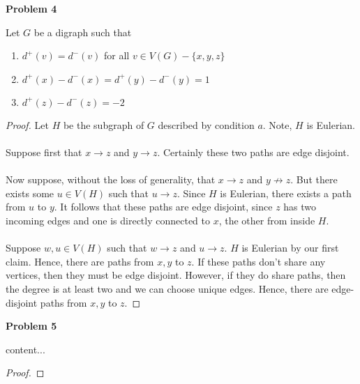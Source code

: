 \documentclass{article}
\newenvironment{claim}[2][Claim]{\begin{trivlist}
		\item[\hskip \labelsep {\bfseries #1}\hskip \labelsep {\bfseries #2}]}{\end{trivlist}}
\begin{document}
\noindent \textbf{Problem 4}
\begin{claim}{}
	Let $G$ be a digraph such that 
	\begin{enumerate}[label=\alph*)]
		\item $d^+(v) = d^-(v)$ for all $v \in V(G) - \{ x,y,z\}$ 
		\item $d^+(x) - d^-(x) = d^+(y) - d^-(y) = 1$
		\item $d^+(z) - d^-(z) = -2$
	\end{enumerate}

\end{claim}
\begin{proof}
	Let $H$ be the subgraph of $G$ described by condition $a$. Note, $H$ is Eulerian. \\ \\
	Suppose first that $x \rightarrow z$ and $y \rightarrow z$. Certainly these two paths are edge disjoint. \\ \\
	Now suppose, without the loss of generality, that $x \rightarrow z$ and $y \not \rightarrow z$. But there exists some $u \in V(H)$ such that $u \rightarrow z$. Since $H$ is Eulerian, there exists a path from $u$ to $y$. It follows that these paths are edge disjoint, since $z$ has two incoming edges and one is directly connected to $x$, the other from inside $H$.\\\\
	Suppose $w,u \in V(H)$ such that $w \rightarrow z$ and $u \rightarrow z$. $H$ is Eulerian by our first claim. Hence, there are paths from $x,y$ to $z$. If these paths don't share any vertices, then they must be edge disjoint. However, if they do share paths, then the degree is at least two and we can choose unique edges. Hence, there are edge-disjoint paths from $x,y$ to $z$.
\end{proof}

\noindent \textbf{Problem 5}
\begin{claim}{}
	content...
\end{claim}
\begin{proof}
\end{proof}
\end{document}
